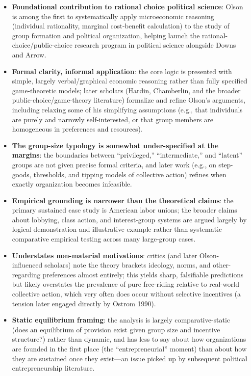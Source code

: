 \documentclass[12pt]{article}
\begin{document}
\begin{itemize}[leftmargin=*, itemsep=4pt]
    \item \textbf{Foundational contribution to rational choice political science}: Olson is among the first to systematically apply microeconomic reasoning (individual rationality, marginal cost-benefit calculation) to the study of group formation and political organization, helping launch the rational-choice/public-choice research program in political science alongside Downs and Arrow.
    \item \textbf{Formal clarity, informal application}: the core logic is presented with simple, largely verbal/graphical economic reasoning rather than fully specified game-theoretic models; later scholars (Hardin, Chamberlin, and the broader public-choice/game-theory literature) formalize and refine Olson's arguments, including relaxing some of his simplifying assumptions (e.g., that individuals are purely and narrowly self-interested, or that group members are homogeneous in preferences and resources).
    \item \textbf{The group-size typology is somewhat under-specified at the margins}: the boundaries between ``privileged,'' ``intermediate,'' and ``latent'' groups are not given precise formal criteria, and later work (e.g., on step-goods, thresholds, and tipping models of collective action) refines when exactly organization becomes infeasible.
    \item \textbf{Empirical grounding is narrower than the theoretical claims}: the primary sustained case study is American labor unions; the broader claims about lobbying, class action, and interest-group systems are argued largely by logical demonstration and illustrative example rather than systematic comparative empirical testing across many large-group cases.
    \item \textbf{Understates non-material motivations}: critics (and later Olson-influenced scholars) note the theory brackets ideology, norms, and other-regarding preferences almost entirely; this yields sharp, falsifiable predictions but likely overstates the prevalence of pure free-riding relative to real-world collective action, which very often does occur without selective incentives (a tension later engaged directly by Ostrom 1990).
    \item \textbf{Static equilibrium framing}: the analysis is largely comparative-static (does an equilibrium of provision exist given group size and incentive structure?) rather than dynamic, and has less to say about how organizations are founded in the first place (the ``entrepreneurial'' moment) than about how they are sustained once they exist---an issue picked up by subsequent political entrepreneurship literature.
\end{itemize}
\end{document}
